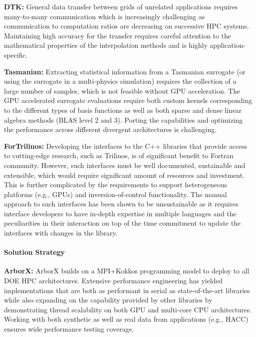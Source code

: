 {\bf DTK:} General data transfer between grids of unrelated applications
requires many-to-many communication which is increasingly challenging as
communication to computation ratios are decreasing on successive HPC systems.
Maintaining high accuracy for the transfer requires careful attention to the
mathematical properties of the interpolation methods and is highly
application-specific.

{\bf Tasmanian:} Extracting statistical information from a Tasmanian surrogate
(or using the surrogate in a multi-physics simulation) requires the collection
of a large number of samples, which is not feasible without GPU acceleration.
The GPU accelerated surrogate evaluations require both custom kernels
corresponding to the different types of basis functions as well as both
sparse and dense linear algebra methods (BLAS level 2 and 3).
Porting the capabilities and optimizing the performance across different
divergent architectures is challenging.

{\bf ForTrilinos:} Developing the interfaces to the C++ libraries that provide
access to cutting-edge research, such as Trilinos,  is of significant benefit
to Fortran community. However, such interfaces must be well documented,
sustainable and extensible, which would require significant amount of resources
and investment. This is further complicated by the requirements to support
heterogeneous platforms (e.g., GPUs) and inversion-of-control functionality.
The manual approach to such interfaces has been shown to be unsustainable as it
requires interface developers to have in-depth expertise in  multiple languages
and the peculiarities in their interaction on top of the time commitment to
update the interfaces with changes in the library.

\paragraph{Solution Strategy}

\nobreak


\indent

{\bf ArborX:} ArborX builds on a MPI+Kokkos programming model to deploy to all
DOE HPC architectures. Extensive performance engineering has yielded
implementations that are both as performant in serial as state-of-the-art
libraries while also expanding on the capability provided by other libraries by
demonstrating thread scalability on both GPU and multi-core CPU architectures.
Working with both synthetic as well as real data from applications (e.g., HACC)
ensures wide performance testing coverage.

